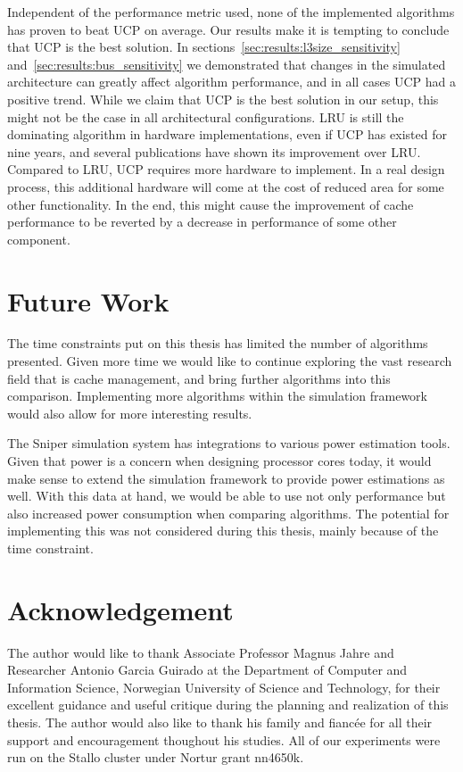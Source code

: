 Independent of the performance metric used, none of the implemented algorithms has proven to beat UCP on average.
Our results make it is tempting to conclude that UCP is the best solution.
In sections~\ref{sec:results:l3size_sensitivity} and~\ref{sec:results:bus_sensitivity} we demonstrated that changes in the simulated architecture can greatly affect algorithm performance, and in all cases UCP had a positive trend.
While we claim that UCP is the best solution in our setup, this might not be the case in all architectural configurations.
LRU is still the dominating algorithm in hardware implementations, even if UCP has existed for nine years, and several publications have shown its improvement over LRU.
Compared to LRU, UCP requires more hardware to implement. 
In a real design process, this additional hardware will come at the cost of reduced area for some other functionality.
In the end, this might cause the improvement of cache performance to be reverted by a decrease in performance of some other component.

\section{Future Work}

The time constraints put on this thesis has limited the number of algorithms presented.
Given more time we would like to continue exploring the vast research field that is cache management, and bring further algorithms into this comparison.
Implementing more algorithms within the simulation framework would also allow for more interesting results.

The Sniper simulation system has integrations to various power estimation tools.
Given that power is a concern when designing processor cores today, it would make sense to extend the simulation framework to provide power estimations as well.
With this data at hand, we would be able to use not only performance but also increased power consumption when comparing algorithms.
The potential for implementing this was not considered during this thesis, mainly because of the time constraint.

\section{Acknowledgement}
The author would like to thank Associate Professor Magnus
Jahre and  Researcher Antonio Garcia Guirado at the Department of Computer and Information Science, Norwegian University of Science and Technology, for their excellent guidance and useful critique during the planning and realization of this thesis.
The author would also like to thank his family and fiancée for all their support and encouragement thoughout his studies.
All of our experiments were run on the Stallo cluster under Nortur grant nn4650k.